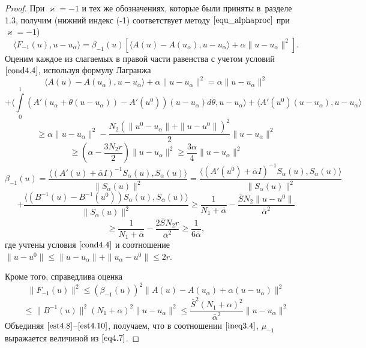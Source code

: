 \begin{proof} При $\varkappa=-1$ и тех же обозначениях, которые были приняты в~разделе 1.3, получим (нижний индекс (-1) соответствует методу $\eqref{equ_alphaproc}$ при $\varkappa=-1$)
$$\langle F_{-1}(u), u-u_\alpha\rangle=\beta _{-1}(u)[\langle A(u)-A(u_\alpha), u-u_\alpha\rangle+\alpha\|u-u_\alpha\|^2].$$
Оценим каждое из слагаемых в правой части равенства с учетом условий $\eqref{cond4.4}$, используя формулу Лагранжа
$$\langle A(u)-A(u_\alpha), u-u_\alpha\rangle+\alpha\|u-u_\alpha\|^2=\alpha\|u-u_\alpha\|^2$$ $$+\langle \int\limits_0^1 (A'(u_\alpha+\theta(u-u_\alpha))-A'(u^0))(u-u_\alpha)d\theta, u-u_\alpha\rangle+\langle A'(u^0)(u-u_\alpha), u-u_\alpha\rangle$$ $$\ge \alpha\|u-u_\alpha\|^2-\frac{N_2(\|u^0-u_\alpha\|+\|u-u^0\|)^2}{2}\|u-u_\alpha\|^2$$
\begin{equation}\label {est4.8}
\ge\left ( \alpha-\frac{3N_2 r}{2}\right )\|u-u_\alpha\|^2\ge\frac{3\alpha}{4}\|u-u_\alpha\|^2
\end{equation}
$$\beta _{-1}(u)=\frac{\langle (A'(u)+\bar\alpha I)^{-1}S_\alpha(u), S_\alpha(u)\rangle}{\|S_\alpha(u)\|^2}=\frac{\langle (A'(u^0)+\bar\alpha I)^{-1}S_\alpha(u), S_\alpha(u)\rangle}{\|S_\alpha(u)\|^2}$$ $$+\frac{\langle (B^{-1}(u)-B^{-1}(u^0))S_\alpha(u), S_\alpha(u)\rangle}{\|S_\alpha(u)\|^2}\ge\frac{1}{N_1+\bar\alpha}-\frac{\bar S N_2\|u-u^0\|}{\bar\alpha^2}$$
\begin{equation}\label{est4.9}
\ge\frac{1}{N_1+\bar\alpha}-\frac{2\bar S N_2 r}{\bar\alpha^2}\ge\frac{1}{6\bar\alpha},
\end{equation}
где учтены условия $\eqref{cond4.4}$ и соотношение $\|u-u^0\|\le\|u-u_\alpha\|+\|u_\alpha-u^0\|\le 2r$.

Кроме того, справедлива оценка
$$\|F_{-1}(u)\|^2\le(\beta_{-1}(u))^2\|A(u)-A(u_\alpha)+\alpha(u-u_\alpha)\|^2$$
\begin{equation}\label{est4.10}
\le\|B^{-1}(u)\|^2(N_1+\alpha)^2\|u-u_\alpha\|^2\le\frac{\bar S^2(N_1+\alpha)^2}{\bar\alpha^2}\|u-u_\alpha\|^2
\end{equation}
Объединяя $\eqref{est4.8}$--$\eqref{est4.10}$, получаем, что в соотношении $\eqref{ineq3.4}$, $\mu_{-1}$ выражается величиной из $\eqref{eq4.7}$.


\end{proof}
